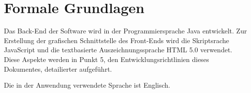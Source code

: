 
\chapter{Formale Grundlagen}


Das Back-End der Software wird in der Programmiersprache Java entwickelt. Zur Erstellung der grafischen Schnittstelle des Front-Ends wird die Skriptsrache JavaScript und die textbasierte Auszeichnungssprache HTML 5.0 verwendet.
Diese Aspekte werden in Punkt 5, den Entwicklungsrichtlinien dieses Dokumentes, detailierter aufgef\"uhrt.

Die in der Anwendung verwendete Sprache ist Englisch.
